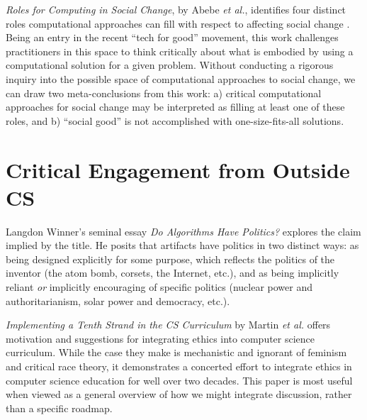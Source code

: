 \documentclass{article}
\newcommand{\etal}{\textit{et al.}}
\begin{document}
    \textit{Roles for Computing in Social Change}, by Abebe \etal, identifies four distinct roles computational approaches can fill with respect to affecting social change \cite{abebeRolesComputingSocial2019}. Being an entry in the recent ``tech for good'' movement, this work challenges practitioners in this space to think critically about what is embodied by using a computational solution for a given problem. Without conducting a rigorous inquiry into the possible space of computational approaches to social change, we can draw two meta-conclusions from this work: a) critical computational approaches for social change may be interpreted as filling at least one of these roles, and b) ``social good'' is not accomplished with one-size-fits-all solutions.
    
    
\section{Critical Engagement from Outside CS}
    Langdon Winner's seminal essay \textit{Do Algorithms Have Politics?}\cite{winnerArtifactsHavePolitics1980} explores the claim implied by the title. He posits that artifacts have politics in two distinct ways: as being designed explicitly for some purpose, which reflects the politics of the inventor (the atom bomb, corsets, the Internet, etc.), and as being implicitly reliant \textit{or} implicitly encouraging of specific politics (nuclear power and authoritarianism, solar power and democracy, etc.).
    
    \textit{Implementing a Tenth Strand in the CS Curriculum} by Martin \etal \cite{martinImplementingTenthStrand1996} offers motivation and suggestions for integrating ethics into computer science curriculum. While the case they make is mechanistic and ignorant of feminism and critical race theory, it demonstrates a concerted effort to integrate ethics in computer science education for well over two decades. This paper is most useful when viewed as a general overview of how we might integrate discussion, rather than a specific roadmap.
    
%
%


\end{document}
